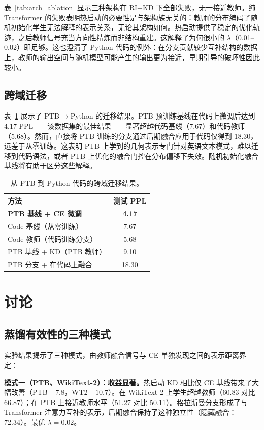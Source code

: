 \documentclass[conference]{IEEEtran}
\begin{document}
表~\ref{tab:arch_ablation} 显示三种架构在 RI+KD 下全部失败，无一接近教师。纯 Transformer 的失败表明热启动的必要性是与架构族无关的：教师的分布编码了随机初始化学生无法解释的表示关系，无论其架构如何。热启动提供了稳定的优化轨迹，之后教师信号充当方向性精炼而非结构重建。这解释了为何很小的 $\lambda$（0.01--0.02）即足够。这也澄清了 Python 代码的例外：在分支贡献较少互补结构的数据上，教师的输出空间与随机模型可能产生的输出更为接近，早期引导的破坏性因此较小。

\subsection{跨域迁移}

表~\ref{tab:cross} 展示了 PTB$\to$Python 的迁移结果。PTB 预训练基线在代码上微调后达到 4.17 PPL——该数据集的最佳结果——显著超越代码基线（7.67）和代码教师（5.68）。然而，直接将 PTB 训练的分支通过后期融合应用于代码仅得到 18.30，远差于从零训练。这表明 PTB 上学到的几何表示专门针对英语文本模式，难以迁移到代码语法\cite{bick2024transformers}，或者 PTB 上优化的融合门控在分布偏移下失效。随机初始化融合基线将有助于区分这些解释。

\begin{table}[t]
\centering
\caption{从 PTB 到 Python 代码的跨域迁移结果。}
\label{tab:cross}
\begin{tabular}{l c}
\toprule
方法 & 测试 PPL \\
\midrule
\textbf{PTB 基线 + CE 微调} & \textbf{4.17} \\
Code 基线（从零训练） & 7.67 \\
Code 教师（代码训练分支） & 5.68 \\
PTB 基线 + KD（PTB 教师） & 9.10 \\
PTB 分支 + 在代码上融合 & 18.30 \\
\bottomrule
\end{tabular}
\end{table}

\section{讨论}

\subsection{蒸馏有效性的三种模式}

实验结果揭示了三种模式，由教师融合信号与 CE 单独发现之间的表示距离界定：

\textbf{模式一（PTB、WikiText-2）：收益显著。}热启动 KD 相比仅 CE 基线带来了大幅改善（PTB $-7.8$，WT2 $-10.7$）。在 WikiText-2 上学生超越教师（60.83 对比 66.87）；在 PTB 上接近教师水平（51.27 对比 50.11）。格拉斯曼分支形成了与 Transformer 注意力互补的表示，后期融合保持了这种独立性（隐藏融合：72.34）。最优 $\lambda{=}0.02$。
\end{document}
